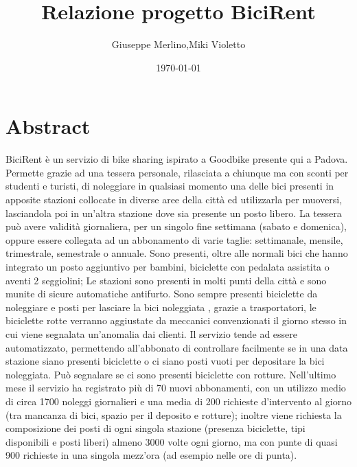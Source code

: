 \documentclass[a4paper,twoside]{article}
\author{Giuseppe Merlino,Miki Violetto}
\title{Relazione progetto BiciRent}
\date{\today}
\begin{document}
\maketitle

\newpage
\tableofcontents
\newpage


\section{Abstract}
BiciRent è un servizio di bike sharing ispirato a Goodbike presente qui a Padova.\newline
Permette grazie ad una tessera personale, rilasciata a chiunque ma con sconti per studenti e turisti, di noleggiare in qualsiasi momento una delle bici presenti in apposite stazioni collocate in diverse aree della città ed utilizzarla per muoversi, lasciandola poi in un'altra stazione dove sia presente un posto libero.\newline
La tessera può avere validità giornaliera, per un singolo fine settimana (sabato e domenica), oppure essere collegata ad un abbonamento di varie taglie: settimanale, mensile, trimestrale, semestrale o  annuale.\newline
Sono presenti, oltre alle normali bici che hanno integrato un posto aggiuntivo per bambini, biciclette con pedalata assistita o aventi 2 seggiolini;\newline
Le stazioni sono presenti in molti punti della città e sono munite di sicure automatiche antifurto. Sono sempre presenti biciclette da noleggiare e posti per lasciare la bici noleggiata , grazie a trasportatori, le biciclette rotte verranno aggiustate da meccanici convenzionati il giorno stesso in cui viene segnalata un'anomalia dai clienti.\newline
Il servizio tende ad essere automatizzato, permettendo all'abbonato di controllare facilmente se in una data stazione siano presenti biciclette o ci siano posti vuoti per depositare la bici noleggiata. Può segnalare se ci sono presenti biciclette con rotture.\newline
Nell'ultimo mese il servizio ha registrato più di 70 nuovi abbonamenti, con un utilizzo medio di circa 1700 noleggi giornalieri e una media di 200 richieste d'intervento al giorno (tra mancanza di bici, spazio per il deposito e rotture);\newline
inoltre viene richiesta la composizione dei posti di ogni singola stazione (presenza biciclette, tipi disponibili e posti liberi) almeno 3000 volte ogni giorno, ma con punte di quasi 900 richieste in una singola mezz'ora (ad esempio nelle ore di punta).
\end{document}
